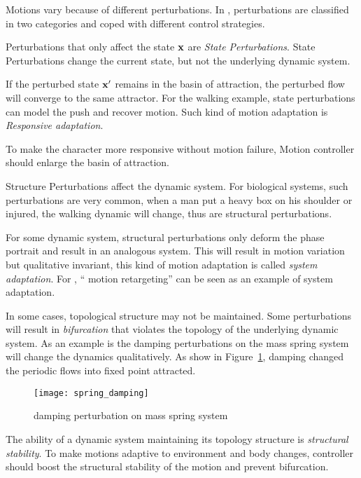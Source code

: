 Motions vary because of different perturbations.
In \moit, perturbations are classified in two categories and coped with different control strategies.

\begin{itemize}

Perturbations that only affect the state $\mathbf{x}$ are \emph{State Perturbations}.
State Perturbations change the current state, but not the underlying dynamic system.


If the perturbed state $\mathbf{x}'$ remains in the basin of attraction, the perturbed flow will converge to the same attractor. 
For the walking example, state perturbations can model the push and recover motion.
Such kind of motion adaptation is \emph{Responsive adaptation}.


To make the character more responsive without motion failure,
Motion controller should enlarge the basin of attraction.






Structure Perturbations affect the dynamic system.
For biological systems,  such perturbations are very common, when a man put a heavy box on his shoulder or injured, the walking dynamic will change, thus are structural perturbations.


For some dynamic system,
structural perturbations only deform the phase portrait and result in an analogous system.
This will result in motion variation but qualitative invariant, this kind of motion adaptation is called \emph{system adaptation}.
For \cms, `` motion retargeting'' can be seen as an example of system adaptation.

In some cases, topological structure may not be maintained.
Some perturbations will result in \emph{bifurcation} that violates the topology of the underlying dynamic system.
As an  example is the damping perturbations on the mass spring system will change the dynamics qualitatively.
As show in Figure~\ref{fig:dampmass}, damping changed the periodic flows into fixed point attracted.

\begin{figure}
\begin{center}
\texttt{[image: spring\_damping]}
\end{center}
\caption{damping perturbation on mass spring system}
\label{fig:dampmass}
\end{figure}

The ability of a dynamic system maintaining its topology structure is \emph{structural stability}.
To make motions adaptive to environment and body changes, controller should boost the structural stability of the motion and prevent bifurcation.
\end{itemize}

